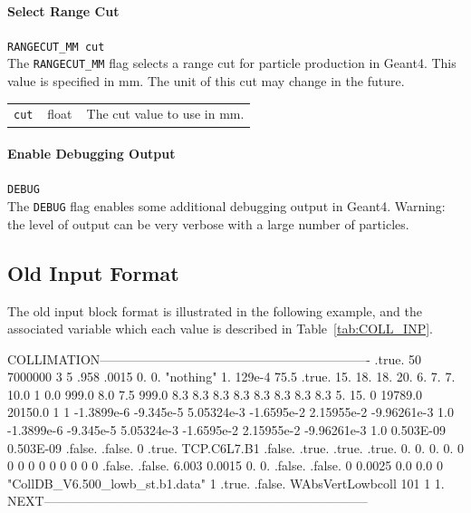 \paragraph{Select Range Cut} \texttt{RANGECUT\_MM cut}\\

The \texttt{RANGECUT\_MM} flag selects a range cut for particle production in Geant4.
This value is specified in mm.
The unit of this cut may change in the future.

\bigskip
\begin{tabular}{@{}llp{0.7\linewidth}}
    \texttt{cut} & float    & The cut value to use in mm.
\end{tabular}

\paragraph{Enable Debugging Output} \texttt{DEBUG}\\

The \texttt{DEBUG} flag enables some additional debugging output in Geant4.
Warning: the level of output can be very verbose with a large number of particles.


\subsection{Old Input Format}\label{sec:coll:oldfmt}

The old input block format is illustrated in the following example, and the associated variable which each value is described in Table~\ref{tab:COLL_INP}.

\bigskip
\begin{cverbatim}
COLLIMATION----------------------------------------------------------------
    .true.
    50   7000000
    3  5 .958  .0015  0.  0.  "nothing"  1. 129e-4  75.5
    .true.  15.  18.  18.  20.  6.  7.  7.  10.0 1 0.0  999.0  8.0   7.5   999.0
    8.3  8.3  8.3  8.3  8.3  8.3  8.3  8.3  5. 15.
    0 19789.0  20150.0  1  1
   -1.3899e-6  -9.345e-5  5.05324e-3  -1.6595e-2  2.15955e-2  -9.96261e-3  1.0
   -1.3899e-6  -9.345e-5  5.05324e-3  -1.6595e-2  2.15955e-2  -9.96261e-3  1.0
    0.503E-09  0.503E-09
   .false. .false. 0 .true. TCP.C6L7.B1 .false. .true. .true. .true.
   0.  0.  0.  0.
   0   0   0   0   0   0   0   0   0   0   .false.
   .false.  6.003  0.0015
   0.  0.  .false. .false.
   0   0.0025  0.0   0.0   0
   "CollDB_V6.500_lowb_st.b1.data"  1
   .true. .false. WAbsVertLowbcoll  101  1  1.
NEXT-----------------------------------------------------------------------------
\end{cverbatim}

